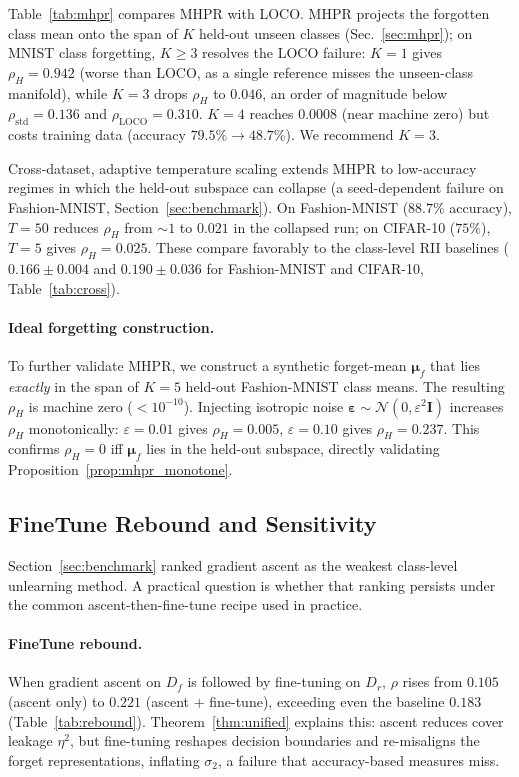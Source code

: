 \documentclass[smallextended]{svjour3}       %
\begin{document}
Table~\ref{tab:mhpr} compares MHPR with LOCO. MHPR projects the forgotten class mean onto the span of $K$ held-out unseen classes (Sec.~\ref{sec:mhpr}); on MNIST class forgetting, $K\ge3$ resolves the LOCO failure: $K{=}1$ gives $\rho_H{=}0.942$ (worse than LOCO, as a single reference misses the unseen-class manifold), while $K{=}3$ drops $\rho_H$ to $0.046$, an order of magnitude below $\rho_{\mathrm{std}}{=}0.136$ and $\rho_{\mathrm{LOCO}}{=}0.310$. $K{=}4$ reaches $0.0008$ (near machine zero) but costs training data (accuracy $79.5\%{\to}48.7\%$). We recommend $K{=}3$.

Cross-dataset, adaptive temperature scaling extends MHPR to low-accuracy regimes in which the held-out subspace can collapse (a seed-dependent failure on Fashion-MNIST, Section~\ref{sec:benchmark}). On Fashion-MNIST ($88.7\%$ accuracy), $T{=}50$ reduces $\rho_H$ from $\sim1$ to $0.021$ in the collapsed run; on CIFAR-10 ($75\%$), $T{=}5$ gives $\rho_H{=}0.025$. These compare favorably to the class-level RII baselines ($0.166{\pm}0.004$ and $0.190{\pm}0.036$ for Fashion-MNIST and CIFAR-10, Table~\ref{tab:cross}).

\paragraph{Ideal forgetting construction.} To further validate MHPR, we construct a synthetic forget-mean $\boldsymbol{\mu}_f$ that lies \emph{exactly} in the span of $K{=}5$ held-out Fashion-MNIST class means. The resulting $\rho_H$ is machine zero ($<10^{-10}$). Injecting isotropic noise $\boldsymbol{\varepsilon}\sim\mathcal{N}(0,\varepsilon^2\mathbf{I})$ increases $\rho_H$ monotonically: $\varepsilon{=}0.01$ gives $\rho_H{=}0.005$, $\varepsilon{=}0.10$ gives $\rho_H{=}0.237$. This confirms $\rho_H{=}0$ iff $\boldsymbol{\mu}_f$ lies in the held-out subspace, directly validating Proposition~\ref{prop:mhpr_monotone}.

\subsection{FineTune Rebound and Sensitivity}
\label{sec:rebound}

Section~\ref{sec:benchmark} ranked gradient ascent as the weakest class-level unlearning method. A practical question is whether that ranking persists under the common ascent-then-fine-tune recipe used in practice.

\paragraph{FineTune rebound.} When gradient ascent on $D_f$ is followed by fine-tuning on $D_r$, $\rho$ rises from $0.105$ (ascent only) to $0.221$ (ascent $+$ fine-tune), exceeding even the baseline $0.183$ (Table~\ref{tab:rebound}). Theorem~\ref{thm:unified} explains this: ascent reduces cover leakage $\eta^2$, but fine-tuning reshapes decision boundaries and re-misaligns the forget representations, inflating $\sigma_2$, a failure that accuracy-based measures miss.
\end{document}
